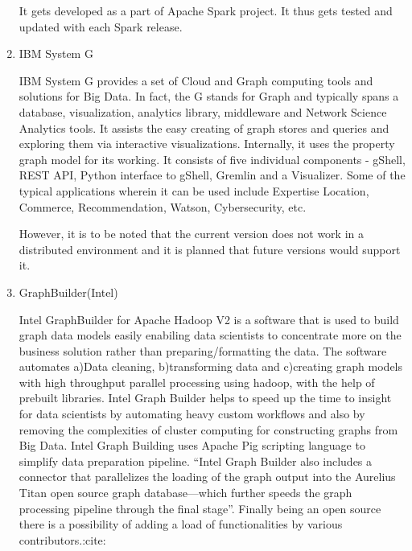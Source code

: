 \begin{enumerate}
It gets developed as a part of Apache Spark project. It thus gets
tested and updated with each Spark release.

\item {} 
IBM System G

\label{\detokenize{i524/technologies:id114}}{\hyperref[\detokenize{i524/technologies:ibmsystemgdocumentation-1}]{\sphinxcrossref{{[}101{]}}}} IBM System G provides a set of
Cloud and Graph computing tools and solutions for Big Data.  In
fact, the G stands for Graph and typically spans a database,
visualization, analytics library, middleware and Network Science
Analytics tools.  \label{\detokenize{i524/technologies:id115}}{\hyperref[\detokenize{i524/technologies:ibmsystemgdocumentation-2}]{\sphinxcrossref{{[}102{]}}}} It assists the
easy creating of graph stores and queries and exploring them via
interactive visualizations.  Internally, it uses the property
graph model for its working.  It consists of five individual
components - gShell, REST API, Python interface to gShell, Gremlin
and a Visualizer.  \label{\detokenize{i524/technologies:id116}}{\hyperref[\detokenize{i524/technologies:ibmsystemgpaper}]{\sphinxcrossref{{[}103{]}}}} Some of the typical
applications wherein it can be used include Expertise Location,
Commerce, Recommendation, Watson, Cybersecurity, etc.

However, it is to be noted that the current version does not work
in a distributed environment and it is planned that future
versions would support it.

\item {} 
GraphBuilder(Intel)

Intel GraphBuilder for Apache Hadoop V2 is a software that is used
to build graph data models easily enabiling data scientists to
concentrate more on the business solution rather than
preparing/formatting the data. The software automates a)Data
cleaning, b)transforming data and c)creating graph models with
high throughput parallel processing using hadoop, with the help of
prebuilt libraries. Intel Graph Builder helps to speed up the time
to insight for data scientists by automating heavy custom
workflows and also by removing the complexities of cluster
computing for constructing graphs from Big Data. Intel Graph
Building uses Apache Pig scripting language to simplify data
preparation pipeline.  ``Intel Graph Builder also includes a
connector that parallelizes the loading of the graph output into
the Aurelius Titan open source graph database—which further speeds
the graph processing pipeline through the final stage''.  Finally
being an open source there is a possibility of adding a load of
functionalities by various contributors.:cite:


\end{enumerate}
